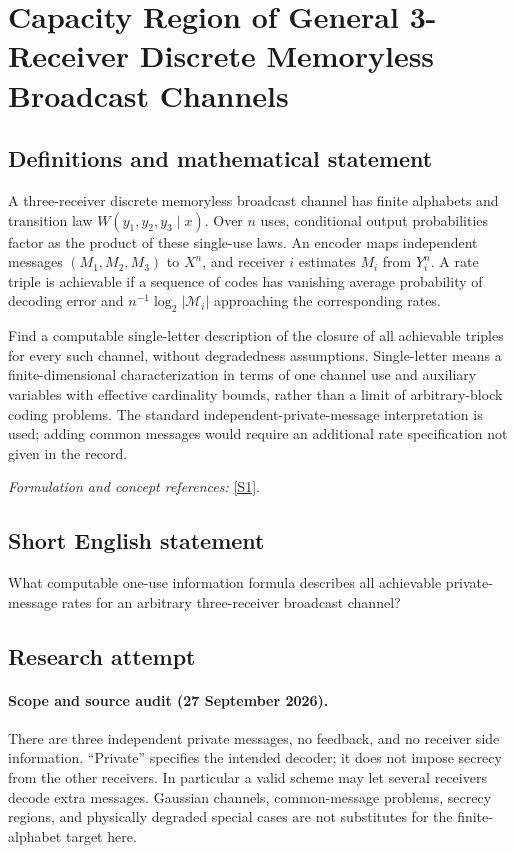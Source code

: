 \documentclass[11pt]{article}
\begin{document}
\section*{\texorpdfstring{Capacity Region of General 3-Receiver Discrete Memoryless Broadcast Channels}{Capacity Region of General 3-Receiver Discrete Memoryless Broadcast Channels}}\label{statement}
\subsection{Definitions and mathematical statement}
A three-receiver discrete memoryless broadcast channel has finite alphabets and transition law $W(y_1,y_2,y_3\mid x)$. Over $n$ uses, conditional output probabilities factor as the product of these single-use laws. An encoder maps independent messages $(M_1,M_2,M_3)$ to $X^n$, and receiver $i$ estimates $M_i$ from $Y_i^n$. A rate triple is achievable if a sequence of codes has vanishing average probability of decoding error and $n^{-1}\log_2|\mathcal M_i|$ approaching the corresponding rates.

Find a computable single-letter description of the closure of all achievable triples for every such channel, without degradedness assumptions. Single-letter means a finite-dimensional characterization in terms of one channel use and auxiliary variables with effective cardinality bounds, rather than a limit of arbitrary-block coding problems. The standard independent-private-message interpretation is used; adding common messages would require an additional rate specification not given in the record.
\par\smallskip\textit{Formulation and concept references:} \href{https://doi.org/10.1017/CBO9780511978166}{[S1]}.

\subsection{Short English statement}
What computable one-use information formula describes all achievable private-message rates for an arbitrary three-receiver broadcast channel?
\subsection{Research attempt}
\paragraph{Scope and source audit (27 September 2026).}
There are three independent private messages, no feedback, and no receiver
side information. ``Private'' specifies the intended decoder; it does
not impose secrecy from the other receivers. In particular a valid scheme
may let several receivers decode extra messages. Gaussian channels,
common-message problems, secrecy regions, and physically degraded
special cases are not substitutes for the finite-alphabet target here.
\end{document}

